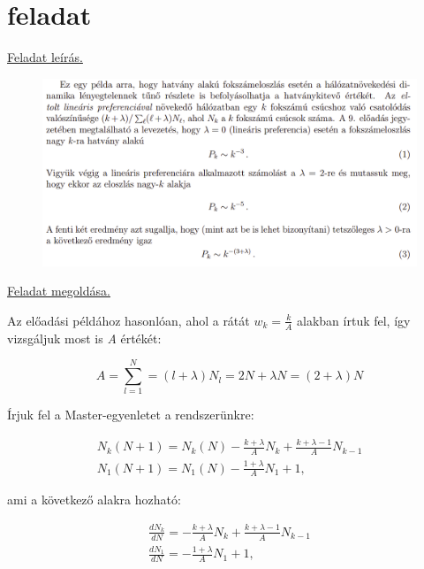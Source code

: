 \documentclass[a4paper, 12pt]{article}
\numberwithin{equation}{section}          %
\numberwithin{figure}{subsection}
\begin{document}
\newpage


\thispagestyle{empty}  

\section{feladat}

\begin{center}
\underline{Feladat leírás.}
\end{center}

\begin{figure}[h!]
	\begin{center}
		\includegraphics[width=1\textwidth]{elsof.png}
	\end{center}
\end{figure}

\begin{center}
\underline{Feladat megoldása.}
\end{center}
\hspace{5cm}

Az előadási példához hasonlóan, ahol a rátát $w_k = \frac{k}{A}$ alakban írtuk fel, így vizsgáljuk most is \textit{A} értékét:

\begin{center}
	\begin{equation}
	A = \sum_{l = 1}^{N} = (l + \lambda)N_l = 2N + \lambda N = (2 + \lambda)N
	\end{equation}
	\label{A}
\end{center}

Írjuk fel a Master-egyenletet a rendszerünkre:

\begin{center}
\begin{gather*}
N_k(N+1) = N_k(N) - \frac{k + \lambda}{A}N_k + \frac{k+\lambda-1}{A}N_{k-1}\\
N_1(N+1) = N_1(N) - \frac{1 + \lambda}{A}N_1 +1,
\end{gather*}
\end{center}
\clearpage
ami a következő alakra hozható:
\begin{center}
	\begin{gather*}
	\frac{dN_k}{dN} =  - \frac{k + \lambda}{A}N_k + \frac{k+\lambda-1}{A}N_{k-1}\\
	\frac{dN_1}{dN} = - \frac{1 + \lambda}{A}N_1 +1,
	\end{gather*}
\end{center}
\end{document}
